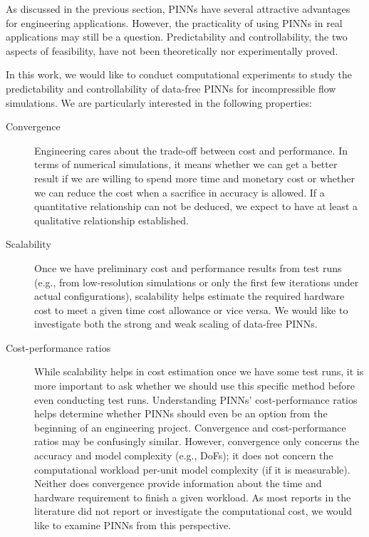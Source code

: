 
As discussed in the previous section, PINNs have several attractive advantages for engineering applications.
However, the practicality of using PINNs in real applications may still be a question.
Predictability and controllability, the two aspects of feasibility, have not been theoretically nor experimentally proved.

In this work, we would like to conduct computational experiments to study the predictability and controllability of data-free PINNs for incompressible flow simulations.
We are particularly interested in the following properties:

\begin{description}
    \item[Convergence]
        Engineering cares about the trade-off between cost and performance.
        In terms of numerical simulations, it means whether we can get a better result if we are willing to spend more time and monetary cost or whether we can reduce the cost when a sacrifice in accuracy is allowed.
        If a quantitative relationship can not be deduced, we expect to have at least a qualitative relationship established.
    \item[Scalability]
        Once we have preliminary cost and performance results from test runs (e.g., from low-resolution simulations or only the first few iterations under actual configurations), scalability helps estimate the required hardware cost to meet a given time cost allowance or vice versa.
        We would like to investigate both the strong and weak scaling of data-free PINNs.
    \item[Cost-performance ratios]
        While scalability helps in cost estimation once we have some test runs, it is more important to ask whether we should use this specific method before even conducting test runs.
        Understanding PINNs' cost-performance ratios helps determine whether PINNs should even be an option from the beginning of an engineering project.
        Convergence and cost\hyp{}performance ratios may be confusingly similar.
        However, convergence only concerns the accuracy and model complexity (e.g., DoFs); it does not concern the computational workload per-unit model complexity (if it is measurable).
        Neither does convergence provide information about the time and hardware requirement to finish a given workload.
        As most reports in the literature did not report or investigate the computational cost, we would like to examine PINNs from this perspective.

\end{description}
